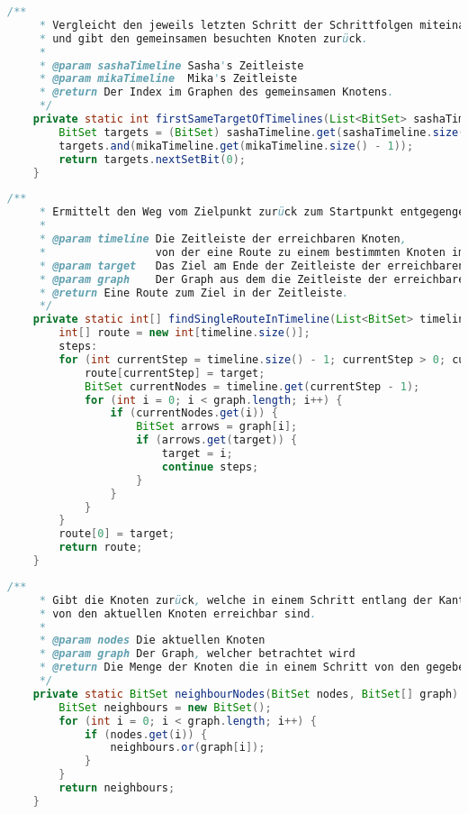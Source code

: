 \documentclass[a4paper,10pt,ngerman]{scrartcl}
\begin{document}
	
	\begin{lstlisting}[frame=single,language=Java,title=Methode firstSameTargetOfTimelines,breaklines=true]
    /**
     * Vergleicht den jeweils letzten Schritt der Schrittfolgen miteinander
     * und gibt den gemeinsamen besuchten Knoten zurück.
     *
     * @param sashaTimeline Sasha's Zeitleiste
     * @param mikaTimeline  Mika's Zeitleiste
     * @return Der Index im Graphen des gemeinsamen Knotens.
     */
    private static int firstSameTargetOfTimelines(List<BitSet> sashaTimeline, List<BitSet> mikaTimeline) {
        BitSet targets = (BitSet) sashaTimeline.get(sashaTimeline.size() - 1).clone();
        targets.and(mikaTimeline.get(mikaTimeline.size() - 1));
        return targets.nextSetBit(0);
    }
	\end{lstlisting}
	
	
	\begin{lstlisting}[frame=single,language=Java,title=Methode findSingleRouteInTimeline,breaklines=true]
    /**
     * Ermittelt den Weg vom Zielpunkt zurück zum Startpunkt entgegengesetzt der Kantenrichtung des Graphen.
     *
     * @param timeline Die Zeitleiste der erreichbaren Knoten,
     *                 von der eine Route zu einem bestimmten Knoten im letzten Zeitpunkt der Zeitleiste gebaut werden soll.
     * @param target   Das Ziel am Ende der Zeitleiste der erreichbaren Knoten, zudem eine Route gebaut werden soll.
     * @param graph    Der Graph aus dem die Zeitleiste der erreichbaren Knoten (und dementsprechend auch das Ziel) stammt.
     * @return Eine Route zum Ziel in der Zeitleiste.
     */
    private static int[] findSingleRouteInTimeline(List<BitSet> timeline, int target, BitSet[] graph) {
        int[] route = new int[timeline.size()];
        steps:
        for (int currentStep = timeline.size() - 1; currentStep > 0; currentStep--) {
            route[currentStep] = target;
            BitSet currentNodes = timeline.get(currentStep - 1);
            for (int i = 0; i < graph.length; i++) {
                if (currentNodes.get(i)) {
                    BitSet arrows = graph[i];
                    if (arrows.get(target)) {
                        target = i;
                        continue steps;
                    }
                }
            }
        }
        route[0] = target;
        return route;
    }
	\end{lstlisting}
	
	
	\begin{lstlisting}[frame=single,language=Java,title=Methode neighbourNodes,breaklines=true]
    /**
     * Gibt die Knoten zurück, welche in einem Schritt entlang der Kantenrichtung,
     * von den aktuellen Knoten erreichbar sind.
     *
     * @param nodes Die aktuellen Knoten
     * @param graph Der Graph, welcher betrachtet wird
     * @return Die Menge der Knoten die in einem Schritt von den gegebenen Knoten erreichbar ist
     */
    private static BitSet neighbourNodes(BitSet nodes, BitSet[] graph) {
        BitSet neighbours = new BitSet();
        for (int i = 0; i < graph.length; i++) {
            if (nodes.get(i)) {
                neighbours.or(graph[i]);
            }
        }
        return neighbours;
    }
	\end{lstlisting}
	
\end{document}
